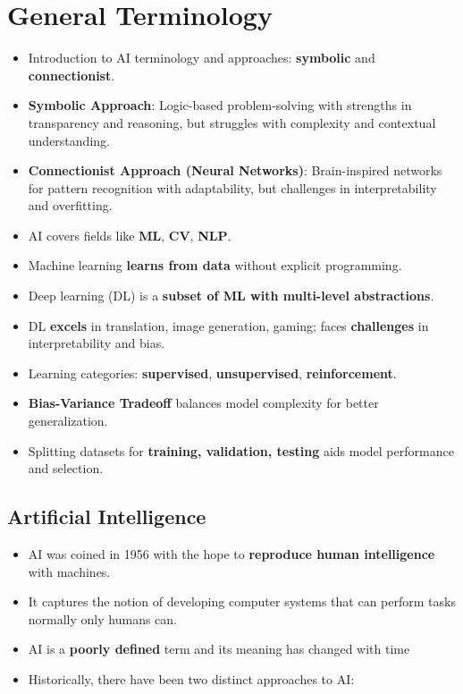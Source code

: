 \chapter{General Terminology}
\begin{idea}
\begin{itemize}
  \item Introduction to AI terminology and approaches: \textbf{symbolic} and \textbf{connectionist}.
  \item \textbf{Symbolic Approach}: Logic-based problem-solving with strengths in transparency and reasoning, but struggles with complexity and contextual understanding.
  \item \textbf{Connectionist Approach (Neural Networks)}: Brain-inspired networks for pattern recognition with adaptability, but challenges in interpretability and overfitting.
  \item AI covers fields like \textbf{ML}, \textbf{CV}, \textbf{NLP}.
  \item Machine learning \textbf{learns from data} without explicit programming.
  \item Deep learning (DL) is a \textbf{subset of ML with multi-level abstractions}.
  \item DL \textbf{excels} in translation, image generation, gaming; faces \textbf{challenges} in interpretability and bias.
  \item Learning categories: \textbf{supervised}, \textbf{unsupervised}, \textbf{reinforcement}.
  \item \textbf{Bias-Variance Tradeoff} balances model complexity for better generalization.
  \item Splitting datasets for \textbf{training, validation, testing} aids model performance and selection.
\end{itemize}
\end{idea}
\section{Artificial Intelligence}
\begin{itemize}
    \item AI was coined in 1956 with the hope to \textbf{reproduce human intelligence} with machines.
    \item It captures the notion of developing computer systems that can perform tasks normally only humans can.
    \item AI is a \textbf{poorly defined} term and its meaning has changed with time
    \item Historically, there have been two distinct approaches to AI: 
\end{itemize}

